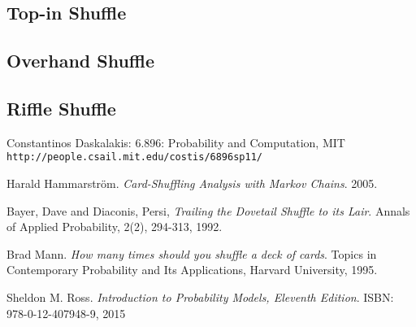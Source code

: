 \documentclass[a4paper, 11pt]{article}
\theoremstyle{definition}
\begin{document}
\subsection{Top-in Shuffle}

\subsection{Overhand Shuffle}

\subsection{Riffle Shuffle}




\begin{thebibliography}{9}
Constantinos Daskalakis: 6.896: Probability and Computation, MIT
\\\texttt{http://people.csail.mit.edu/costis/6896sp11/}

Harald Hammarstr\"om.
\textit{Card-Shuffling Analysis with Markov Chains}. 
2005.
 
Bayer, Dave and Diaconis, Persi, 
\textit{Trailing the Dovetail Shuffle to its Lair}. Annals of Applied Probability, 2(2), 294-313, 1992.

Brad Mann. 
\textit{How many times should you shuffle a deck of cards}. 
Topics in Contemporary Probability and Its Applications, Harvard University, 1995.

Sheldon M. Ross.
\textit{Introduction to Probability Models, Eleventh Edition}. ISBN: 978-0-12-407948-9, 2015

\end{thebibliography}
\end{document}
